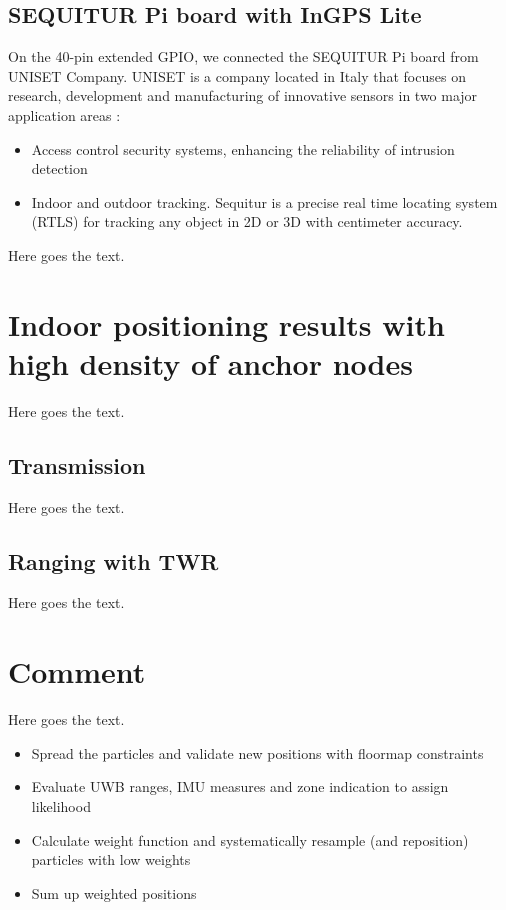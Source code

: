 \subsection{SEQUITUR Pi board with InGPS Lite}
On the 40-pin extended GPIO, we connected the SEQUITUR Pi board from UNISET Company. UNISET is a company located in Italy that focuses on research, development and manufacturing of innovative sensors in two major application areas \cite{Uniset}:

\begin{itemize}
\item Access control security systems, enhancing the reliability of intrusion detection
\item Indoor and outdoor tracking. Sequitur is a precise real time locating system (RTLS) for tracking any object in 2D or 3D with centimeter accuracy.
\end{itemize}
Here goes the text.


\section{Indoor positioning results with high density of anchor nodes}
Here goes the text.

\subsection{Transmission}
Here goes the text.
\subsection{Ranging with TWR}
Here goes the text.


\section{Comment}
Here goes the text.
\begin{itemize}
\item Spread the particles and validate new positions with floormap constraints
\item Evaluate UWB ranges, IMU measures and zone indication to assign likelihood
\item Calculate weight function and systematically resample (and reposition) particles with low weights
\item Sum up weighted positions
\end{itemize}

